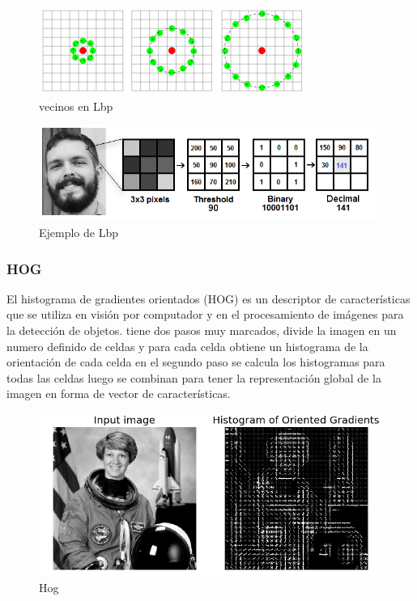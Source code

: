 \documentclass[a4paper,11pt]{report}
\begin{document}
\begin{figure}[h]
	\centering
	\includegraphics[scale=0.8]{lbp}
	\caption{vecinos en Lbp}
	\label{fig:Vecinos en lbp}
\end{figure}

\newpage

\begin{figure}[h]
	\centering
	\includegraphics[scale=0.4]{lbpe}
	\caption{Ejemplo de  Lbp}
	\label{fig:Ejemplo}
\end{figure}
\subsubsection{HOG}
El histograma de gradientes orientados (HOG) es un descriptor de características que se utiliza en  visión por computador y en el procesamiento de imágenes para la detección de objetos. tiene dos pasos muy marcados, divide la imagen en un numero definido de celdas y para cada celda obtiene un histograma de la orientación de cada celda en el segundo paso  se calcula los histogramas para todas las celdas luego se combinan para tener la representación global de la imagen en forma de vector de características. 

\begin{figure}[h]
	\centering
	\includegraphics[scale=0.4]{hog.png}
	\caption{Hog}
	\label{fig:Hog}
\end{figure}
\end{document}
